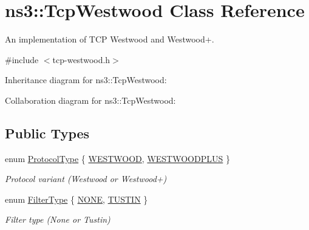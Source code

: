 \hypertarget{classns3_1_1TcpWestwood}{}\section{ns3\+:\+:Tcp\+Westwood Class Reference}
\label{classns3_1_1TcpWestwood}


An implementation of T\+CP Westwood and Westwood+.  




{\ttfamily \#include $<$tcp-\/westwood.\+h$>$}



Inheritance diagram for ns3\+:\+:Tcp\+Westwood\+:


Collaboration diagram for ns3\+:\+:Tcp\+Westwood\+:
\subsection*{Public Types}
\begin{DoxyCompactItemize}
\item 
enum \hyperlink{classns3_1_1TcpWestwood_aa511ec7338686eb4d01c636f84e3f4d2}{Protocol\+Type} \{ \hyperlink{classns3_1_1TcpWestwood_aa511ec7338686eb4d01c636f84e3f4d2a32b14b0869d40dfc08e5dc457e246a07}{W\+E\+S\+T\+W\+O\+OD}, 
\hyperlink{classns3_1_1TcpWestwood_aa511ec7338686eb4d01c636f84e3f4d2a642fb164d4d2dd0e08facf3aa09eb8fc}{W\+E\+S\+T\+W\+O\+O\+D\+P\+L\+US}
 \}\begin{DoxyCompactList}\small\item\em Protocol variant (Westwood or Westwood+) \end{DoxyCompactList}
\item 
enum \hyperlink{classns3_1_1TcpWestwood_a705750d92431a17a9997ad6fbf2918aa}{Filter\+Type} \{ \hyperlink{classns3_1_1TcpWestwood_a705750d92431a17a9997ad6fbf2918aaaec226af638268514e4c173c0483421c1}{N\+O\+NE}, 
\hyperlink{classns3_1_1TcpWestwood_a705750d92431a17a9997ad6fbf2918aaa57940865dfadfd958171dc42efa5d41e}{T\+U\+S\+T\+IN}
 \}\begin{DoxyCompactList}\small\item\em Filter type (None or Tustin) \end{DoxyCompactList}
\end{DoxyCompactItemize}
